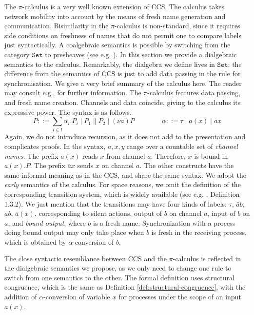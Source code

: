 \documentclass[orivec]{llncs}
\newcommand{\mC}[1]{\mathtt{#1}}
\newcommand{\Set}{\mC{Set}}
\begin{document}
The $\pi$-calculus \cite{mpw92} is a very well known extension of CCS. The calculus takes network mobility into account by the means of fresh name generation and communication. Bisimilarity in the $\pi$-calculus is non-standard, since it requires side conditions on freshness of names that do not permit one to compare labels just syntactically. A coalgebraic semantics is possible by switching from the category $\Set$ to presheaves (see e.g. \cite{ft99}). In this section we provide a dialgebraic semantics to the calculus. Remarkably, the dialgebra we define lives in $\Set$; the difference from the semantics of CCS is just to add data passing in the rule for synchronisation.
We give a very brief summary of the calculus here. The reader may consult e.g., \cite{San01} for further information. The $\pi$-calculus features data passing, and fresh name creation. Channels and data coincide, giving to the calculus its expressive power. The syntax is as follows.
$$ P ::= \sum_{i \in I} \alpha_i . P_i \mid P_1 \parallel P_2 \mid (\nu a) P \qquad \qquad \alpha ::= \tau \mid a(x) \mid \bar ax$$
Again, we do not introduce recursion, as it does not add to the presentation and complicates proofs.  In the syntax, $a,x,y$ range over a countable set of \emph{channel names}.
The prefix $a(x)$ reads $x$ from channel $a$. Therefore, $x$ is bound in $a(x).P$. The prefix $\bar a x$ sends $x$ on channel $a$. The other constructs have the same informal meaning as in the CCS, and share the same syntax.  We adopt the \emph{early} semantics of the calculus. For space reasons, we omit the definition of the corresponding transition system, which is widely available (see e.g. \cite{San01}, Definition 1.3.2). We just mention that the transitions may have four kinds of labels: $\tau$, $\bar a b$, $a b$, $\bar a (x)$, corresponding to silent actions, output of $b$ on channel $a$, input of $b$ on $a$, and \emph{bound output}, where $b$ is a fresh name. Synchronization with a process doing bound output may only take place when $b$ is fresh in the receiving process, which is obtained by $\alpha$-conversion of $b$.

The close syntactic resemblance between CCS and the $\pi$-calculus is reflected in the dialgebraic semantics we propose, as we only need to change one rule to switch from one semantics to the other. The formal definition uses structural congruence, which is the same as Definition \ref{def:structural-congruence},  with the addition of $\alpha$-conversion of variable $x$ for processes under the scope of an input $a(x)$.
\end{document}
